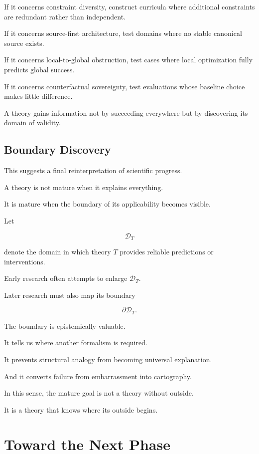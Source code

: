 \documentclass[11pt]{article}
\theoremstyle{remark}
\begin{document}
If it concerns constraint diversity, construct curricula where additional
constraints are redundant rather than independent.

If it concerns source-first architecture, test domains where no stable canonical
source exists.

If it concerns local-to-global obstruction, test cases where local optimization
fully predicts global success.

If it concerns counterfactual sovereignty, test evaluations whose baseline
choice makes little difference.

A theory gains information not by succeeding everywhere but by discovering its
domain of validity.

\subsection{Boundary Discovery}

This suggests a final reinterpretation of scientific progress.

A theory is not mature when it explains everything.

It is mature when the boundary of its applicability becomes visible.

Let

\begin{equation}
\mathcal{D}_T
\end{equation}

denote the domain in which theory $T$ provides reliable predictions or
interventions.

Early research often attempts to enlarge $\mathcal{D}_T$.

Later research must also map its boundary

\begin{equation}
\partial\mathcal{D}_T.
\end{equation}

The boundary is epistemically valuable.

It tells us where another formalism is required.

It prevents structural analogy from becoming universal explanation.

And it converts failure from embarrassment into cartography.

In this sense, the mature goal is not a theory without outside.

It is a theory that knows where its outside begins.

\section{Toward the Next Phase}
\end{document}
